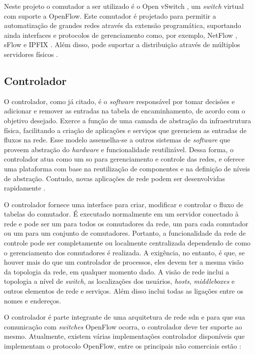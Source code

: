 Neste projeto o comutador a ser utilizado é o Open vSwitch \cite{website:ovs}, um \textit{switch} virtual com suporte a OpenFlow. Este comutador é projetado para permitir a automatização de grandes redes através da extensão programática, suportando ainda interfaces e protocolos de gerenciamento como, por exemplo, NetFlow \cite{rfc3954}, sFlow \cite{rfc3176} e IPFIX \cite{rfc5153}. Além disso, pode suportar a distribuição através de múltiplos servidores físicos \cite{website:ovs}.

\subsection{Controlador}
\label{subsec:controlador}

O controlador, como já citado, é o \textit{software} responsável por tomar decisões e adicionar e remover as entradas na tabela de encaminhamento, de acordo com o objetivo desejado. Exerce a função de uma camada de abstração da infraestrutura física, facilitando a criação de aplicações e serviços que gerenciem as entradas de fluxos na rede. Esse modelo assemelha-se a outros sistemas de \textit{software} que proveem abstração do \textit{hardware} e funcionalidade reutilizável. Dessa forma, o controlador atua como um \gls{so} para gerenciamento e controle das redes, e oferece uma plataforma com base na reutilização de componentes e na definição de níveis de abstração. Contudo, novas aplicações de rede podem ser desenvolvidas rapidamente \cite{Gude:2008}.

O controlador fornece uma interface para criar, modificar e controlar o fluxo de tabelas do comutador. É executado normalmente em um servidor conectado à rede e pode ser um para todos os comutadores da rede, um para cada comutador ou um para um conjunto de comutadores.  Portanto, a funcionalidade da rede de controle pode ser completamente ou localmente centralizada dependendo de como o gerenciamento dos comutadores é realizada. A exigência, no entanto, é que, se houver mais do que um controlador de processos, eles devem ter a mesma visão da topologia da rede, em qualquer momento dado. A visão de rede inclui a topologia a nível de \textit{switch}, as localizações dos usuários, \textit{hosts}, \textit{middleboxes} e outros elementos de rede e serviços. Além disso inclui todas as ligações entre os nomes e endereços.

O controlador é parte integrante de uma arquitetura de rede \gls{sdn} e para que sua comunicação com \textit{switches} OpenFlow ocorra, o controlador deve ter suporte ao mesmo. Atualmente, existem várias implementações controlador disponíveis que implementam o protocolo OpenFlow, entre os principais não comerciais estão \cite{Kreutz:2013,Xia:2015}:


